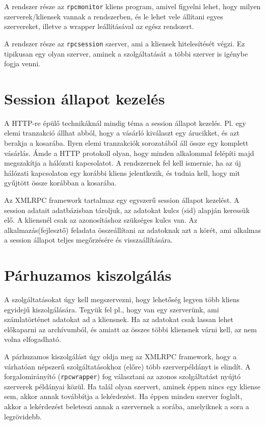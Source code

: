 A rendszer része az {\tt rpcmonitor} kliens program, 
amivel figyelni lehet, hogy milyen szerverek/kliensek
vannak a rendszerben, és le lehet vele állítani egyes szervereket,
illetve a wrapper leállításával az egész rendszert.

A rendszer része az {\tt rpcsession} szerver, 
ami a kliensek hitelesítését végzi. Ez tipikusan egy olyan
szerver, aminek a szolgáltatását a többi szerver is igénybe
fogja venni.


\section{Session állapot kezelés}

A HTTP-re épülő technikáknál mindig téma a session állapot kezelés.
Pl. egy elemi tranzakció állhat abból, hogy a vásárló kiválaszt egy árucikket,
és azt berakja a kosarába. Ilyen elemi tranzakciók sorozatából
áll össze egy komplett vásárlás. Ámde  a HTTP protokoll olyan, 
hogy minden alkalommal felépíti majd megszakítja a hálózati kapcsolatot.
A rendszernek fel kell ismernie, ha az új hálózati kapcsolaton
egy korábbi kliens jelentkezik, és tudnia kell, hogy mit gyűjtött
össze korábban a kosarába.

Az XMLRPC framework tartalmaz egy egyszerű session állapot kezelést.
A session adatait adatbázisban tároljuk, az adatokat  kulcs
(sid) alapján keressük elő. A kliensnél csak az azonosításhoz
szükséges kulcs van. Az alkalmazás(fejlesztő) feladata 
összeállítani az adatoknak azt a körét, ami alkalmas a session
állapot teljes megőrzésére és visszaállítására.


\section{Párhuzamos kiszolgálás}

A szolgáltatásokat úgy kell megszervezni, 
hogy lehetőség legyen több kliens egyidejű kiszolgálására.
Tegyük fel pl., hogy van egy szerverünk, ami számlatörténet adatokat
ad a kliensnek. Ha az adatokat csak lassan lehet előkaparni
az archívumból, és amiatt az összes többi kliensnek várni kell,
az nem volna elfogadható.

A párhuzamos kiszolgálást úgy oldja meg az  XMLRPC framework,
hogy a várhatóan népszerű szolgáltatásokhoz (előre) több szerverpéldányt 
is elindít. A forgalomirányító ({\tt rpcwrapper}) fog választani az azonos
szolgáltatást nyújtó szerverek példányai közül. Ha talál olyan
szervert, aminek éppen nincs egy kliense sem, akkor annak továbbítja
a lekérdezést. Ha éppen minden szerver foglalt, akkor a lekérdezést
beleteszi annak a szervernek a sorába, amelyiknek a sora a legrövidebb.

